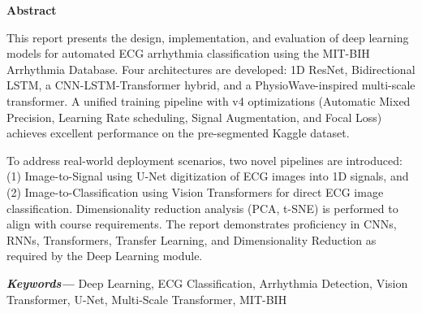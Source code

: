 \vspace*{4cm}
\begin{center}
    {\Large\bf Abstract}
\end{center}
\vskip 0.5cm
\vskip 0.5cm

This report presents the design, implementation, and evaluation of deep learning models for automated ECG arrhythmia classification using the MIT-BIH Arrhythmia Database. Four architectures are developed: 1D ResNet, Bidirectional LSTM, a CNN-LSTM-Transformer hybrid, and a PhysioWave-inspired multi-scale transformer. A unified training pipeline with v4 optimizations (Automatic Mixed Precision, Learning Rate scheduling, Signal Augmentation, and Focal Loss) achieves excellent performance on the pre-segmented Kaggle dataset.

To address real-world deployment scenarios, two novel pipelines are introduced: (1) Image-to-Signal using U-Net digitization of ECG images into 1D signals, and (2) Image-to-Classification using Vision Transformers for direct ECG image classification. Dimensionality reduction analysis (PCA, t-SNE) is performed to align with course requirements. The report demonstrates proficiency in CNNs, RNNs, Transformers, Transfer Learning, and Dimensionality Reduction as required by the Deep Learning module.

\providecommand{\keywords}[1]{
  \small
  \textbf{\textit{Keywords---}} #1
}
\keywords{Deep Learning, ECG Classification, Arrhythmia Detection, Vision Transformer, U-Net, Multi-Scale Transformer, MIT-BIH}

